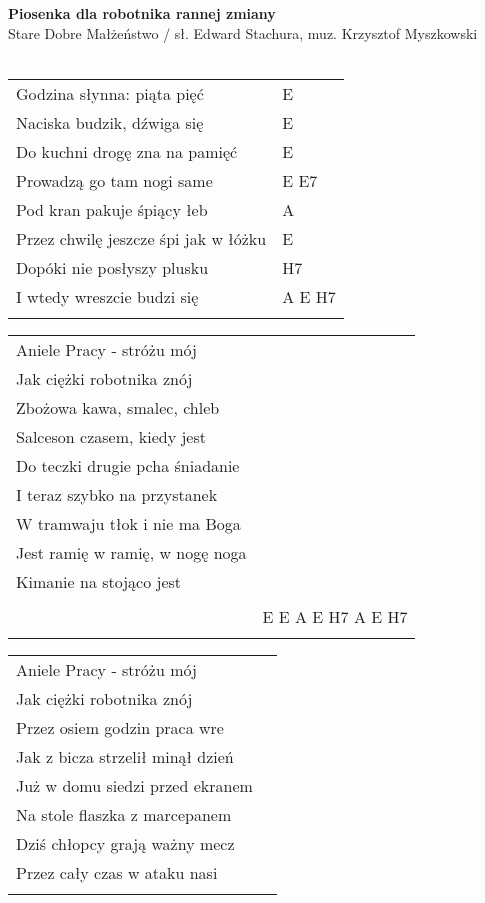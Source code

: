 \documentclass[a5paper]{article}
\begin{document}


\noindent
\fontsize{12pt}{15pt}\selectfont
\textbf{Piosenka dla robotnika rannej zmiany} \\
\fontsize{8pt}{10pt}\selectfont
Stare Dobre Małżeństwo / sł. Edward Stachura, muz. Krzysztof Myszkowski \\ \\
\fontsize{10pt}{12pt}\selectfont
{}
\begin{tabular}{@{}p{7.50cm}p{3cm}@{}}
\noindent
Godzina słynna: piąta pięć & E \\
Naciska budzik, dźwiga się & E \\
Do kuchni drogę zna na pamięć & E \\
Prowadzą go tam nogi same & E E7 \\
Pod kran pakuje śpiący łeb & A \\
Przez chwilę jeszcze śpi jak w łóżku & E \\
Dopóki nie posłyszy plusku & H7 \\
I wtedy wreszcie budzi się & A E H7 \\ \\
\end{tabular}

\noindent
\begin{tabular}{@{}p{6.50cm}p{3cm}@{}}
Aniele Pracy - stróżu mój \\
Jak ciężki robotnika znój \\
Zbożowa kawa, smalec, chleb \\
Salceson czasem, kiedy jest \\
Do teczki drugie pcha śniadanie \\
I teraz szybko na przystanek \\
W tramwaju tłok i nie ma Boga \\
Jest ramię w ramię, w nogę noga \\
Kimanie na stojąco jest \\ \\

& E E A E H7 A E H7 \\ \\
\end{tabular}

\noindent
\begin{tabular}{@{}p{6.50cm}p{3cm}@{}}
Aniele Pracy - stróżu mój \\
Jak ciężki robotnika znój \\
Przez osiem godzin praca wre \\
Jak z bicza strzelił minął dzień \\
Już w domu siedzi przed ekranem \\
Na stole flaszka z marcepanem \\
Dziś chłopcy grają ważny mecz \\
Przez cały czas w ataku nasi \\ \\
\end{tabular}
\end{document}
